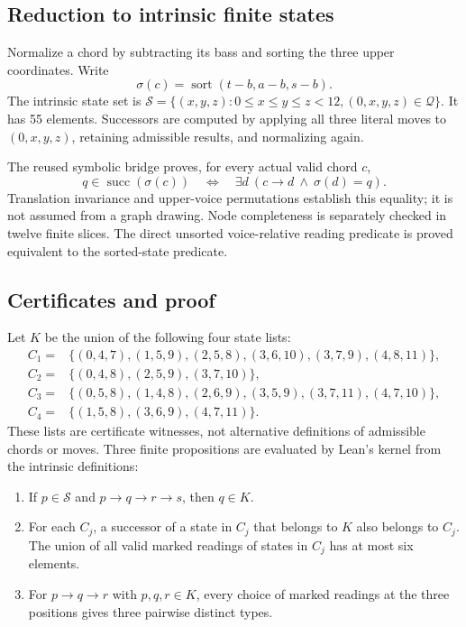 \documentclass[11pt]{article}
\newcommand{\Q}{\mathcal Q}
\newcommand{\Sh}{\mathcal S}
\begin{document}
\subsection{Reduction to intrinsic finite states}
Normalize a chord by subtracting its bass and sorting the three upper
coordinates. Write
\[
\sigma(c)=\operatorname{sort}(t-b,a-b,s-b).
\]
The intrinsic state set is
$\Sh=\{(x,y,z):0\leq x\leq y\leq z<12,
(0,x,y,z)\in\Q\}$. It has 55 elements. Successors are computed by applying
all three literal moves to $(0,x,y,z)$, retaining admissible results, and
normalizing again.

The reused symbolic bridge proves, for every actual valid chord $c$,
\[
q\in\operatorname{succ}(\sigma(c))
\quad\Longleftrightarrow\quad
\exists d\ (c\longrightarrow d\ \land\ \sigma(d)=q).
\]
Translation invariance and upper-voice permutations establish this equality;
it is not assumed from a graph drawing. Node completeness is separately
checked in twelve finite slices. The direct unsorted voice-relative reading
predicate is proved equivalent to the sorted-state predicate.

\subsection{Certificates and proof}
Let $K$ be the union of the following four state lists:
\[
\begin{aligned}
C_1={}&\{(0,4,7),(1,5,9),(2,5,8),(3,6,10),(3,7,9),(4,8,11)\},\\
C_2={}&\{(0,4,8),(2,5,9),(3,7,10)\},\\
C_3={}&\{(0,5,8),(1,4,8),(2,6,9),(3,5,9),(3,7,11),(4,7,10)\},\\
C_4={}&\{(1,5,8),(3,6,9),(4,7,11)\}.
\end{aligned}
\]
These lists are certificate witnesses, not alternative definitions of
admissible chords or moves. Three finite propositions are evaluated by Lean's
kernel from the intrinsic definitions:
\begin{enumerate}
\item If $p\in\Sh$ and $p\to q\to r\to s$, then $q\in K$.
\item For each $C_j$, a successor of a state in $C_j$ that belongs to $K$
also belongs to $C_j$. The union of all valid marked readings of states in
$C_j$ has at most six elements.
\item For $p\to q\to r$ with $p,q,r\in K$, every choice of marked readings
at the three positions gives three pairwise distinct types.
\end{enumerate}
\end{document}
